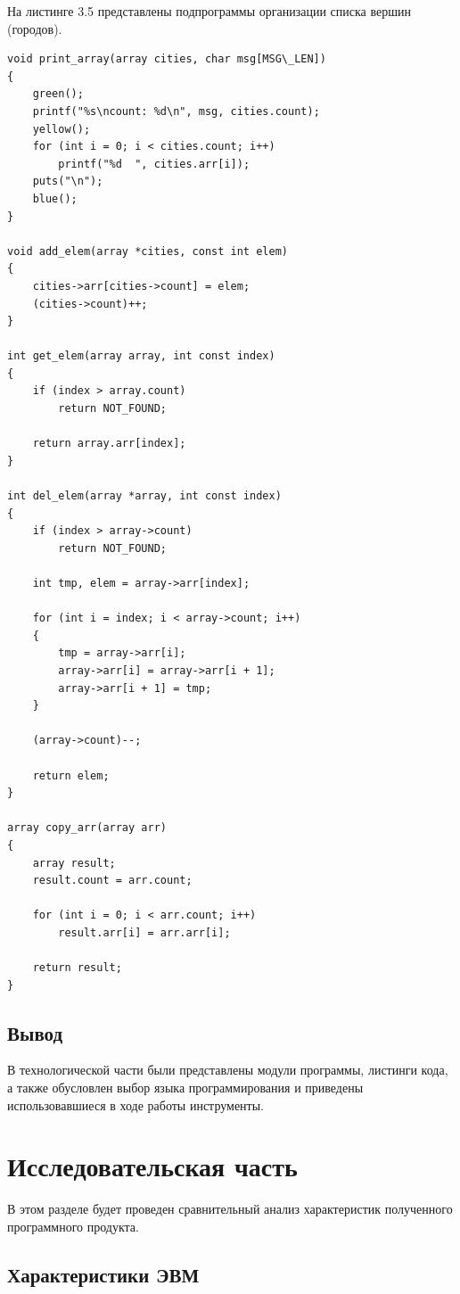 \documentclass[12pt]{report}
\begin{document}
На листинге 3.5 представлены подпрограммы организации списка вершин (городов).

\begin{lstlisting}[label=some-code,caption=Подпрограммы организации списка вершин (городов)]
void print_array(array cities, char msg[MSG\_LEN])
{
	green();
	printf("%s\ncount: %d\n", msg, cities.count);
	yellow();
	for (int i = 0; i < cities.count; i++)
		printf("%d  ", cities.arr[i]);
	puts("\n");
	blue();
}

void add_elem(array *cities, const int elem)
{
	cities->arr[cities->count] = elem;
	(cities->count)++;
}

int get_elem(array array, int const index)
{
	if (index > array.count)
		return NOT_FOUND;

	return array.arr[index];
}

int del_elem(array *array, int const index)
{
	if (index > array->count)
		return NOT_FOUND;

	int tmp, elem = array->arr[index];

	for (int i = index; i < array->count; i++)
	{
		tmp = array->arr[i];
		array->arr[i] = array->arr[i + 1];
		array->arr[i + 1] = tmp;
	}

	(array->count)--;

	return elem;
}

array copy_arr(array arr)
{
	array result;
	result.count = arr.count;

	for (int i = 0; i < arr.count; i++)
		result.arr[i] = arr.arr[i];

	return result;
}\end{lstlisting}


\section{Вывод}
В технологической части были представлены модули программы, листинги кода, а также обусловлен выбор языка программирования и приведены использовавшиеся в ходе работы инструменты.

\chapter{Исследовательская часть}

В этом разделе будет проведен сравнительный анализ характеристик полученного программного продукта.

\section{Характеристики ЭВМ}
\end{document}
